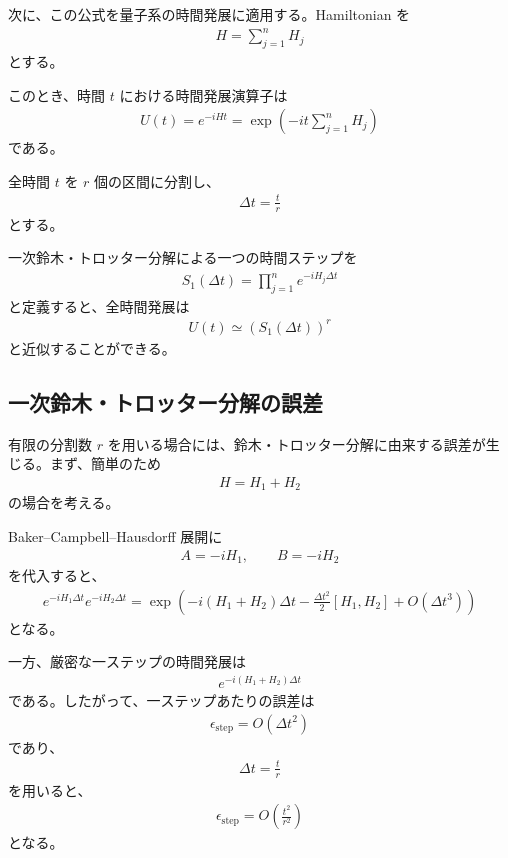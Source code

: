 \documentclass[a4paper,10.5pt]{article}
\numberwithin{equation}{section}
\begin{document}
次に、この公式を量子系の時間発展に適用する。Hamiltonian を
\begin{align}
    H=\sum_{j=1}^{n}H_j
\end{align}
とする。

このとき、時間 $t$ における時間発展演算子は
\begin{align}
    U(t)
    =
    e^{-iHt}
    =
    \exp\left(
        -it\sum_{j=1}^{n}H_j
    \right)
\end{align}
である。

全時間 $t$ を $r$ 個の区間に分割し、
\begin{align}
    \Delta t=\frac{t}{r}
\end{align}
とする。

一次鈴木・トロッター分解による一つの時間ステップを
\begin{align}
    S_1(\Delta t)
    =
    \prod_{j=1}^{n}
    e^{-iH_j\Delta t}
\end{align}
と定義すると、全時間発展は
\begin{align}
    U(t)
    \simeq
    \left(
        S_1(\Delta t)
    \right)^r
\end{align}
と近似することができる。

\subsection{一次鈴木・トロッター分解の誤差}

有限の分割数 $r$ を用いる場合には、鈴木・トロッター分解に由来する誤差が生じる。まず、簡単のため
\begin{align}
    H=H_1+H_2
\end{align}
の場合を考える。

Baker--Campbell--Hausdorff 展開に
\begin{align}
    A=-iH_1,
    \qquad
    B=-iH_2
\end{align}
を代入すると、
\begin{align}
    e^{-iH_1\Delta t}
    e^{-iH_2\Delta t}
    =
    \exp\left(
        -i(H_1+H_2)\Delta t
        -
        \frac{\Delta t^2}{2}[H_1,H_2]
        +
        O(\Delta t^3)
    \right)
\end{align}
となる。

一方、厳密な一ステップの時間発展は
\begin{align}
    e^{-i(H_1+H_2)\Delta t}
\end{align}
である。したがって、一ステップあたりの誤差は
\begin{align}
    \epsilon_{\mathrm{step}}
    =
    O(\Delta t^2)
\end{align}
であり、
\begin{align}
    \Delta t=\frac{t}{r}
\end{align}
を用いると、
\begin{align}
    \epsilon_{\mathrm{step}}
    =
    O\left(
        \frac{t^2}{r^2}
    \right)
\end{align}
となる。
\end{document}
